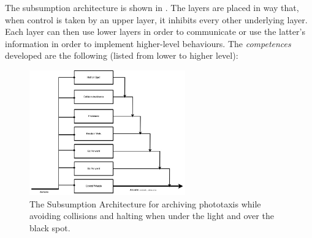 The subsumption architecture is shown in . The layers are
placed in way that, when control is taken by an upper layer, it inhibits every
other underlying layer. Each layer can then use lower layers in order to
communicate or use the latter's information in order to implement higher-level
behaviours.
The \emph{competences} developed are the following (listed from lower to higher level):
%
\begin{figure}[ht]
	\centering
	\includegraphics[width=0.6\textwidth]{figures/sub-arch.jpg}
	\caption{The Subsumption Architecture for archiving phototaxis while
		avoiding collisions and halting when under the light and over the black
		spot.}
	\label{fig:sub-arch}
\end{figure}
%

